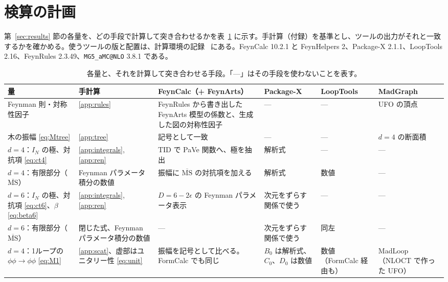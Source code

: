 \documentclass[a4paper,10pt]{ltjsarticle}
\begin{document}
\section{検算の計画}\label{sec:plan}

第~\ref{sec:results} 節の各量を、どの手段で計算して突き合わせるかを表~\ref{tab:plan} に示す。手計算（付録）を基準とし、ツールの出力がそれと一致するかを確かめる。使うツールの版と配置は、計算環境の記録~\cite{env} にある。FeynCalc 10.2.1 と FeynHelpers 2、Package-X 2.1.1、LoopTools 2.16、FeynRules 2.3.49、\texttt{MG5\_aMC@NLO} 3.8.1 である。

\begin{table}[tbp]
\centering\small
\caption{各量と、それを計算して突き合わせる手段。「—」はその手段を使わないことを表す。}
\label{tab:plan}
\begin{tabularx}{\linewidth}{>{\raggedright\arraybackslash}p{3.2cm}>{\raggedright\arraybackslash}p{2.0cm}>{\raggedright\arraybackslash}X>{\raggedright\arraybackslash}p{2.0cm}>{\raggedright\arraybackslash}p{1.7cm}>{\raggedright\arraybackslash}p{1.9cm}}
\toprule
\textbf{量} & \textbf{手計算} & \textbf{FeynCalc（+ FeynArts）} & \textbf{Package-X} & \textbf{LoopTools} & \textbf{MadGraph} \\
\midrule
Feynman 則・対称性因子 & \ref{app:rules} & FeynRules から書き出した FeynArts 模型の係数と、生成した図の対称性因子 & — & — & UFO の頂点 \\
木の振幅 \eqref{eq:Mtree} & \ref{app:tree} & 記号として一致 & — & — & $d=4$ の断面積 \\
$d=4$：$I_N$ の極、対抗項 \eqref{eq:ct4} & \ref{app:integrals}, \ref{app:ren} & TID で PaVe 関数へ、極を抽出 & 解析式 & — & — \\
$d=4$：有限部分（$\overline{\mathrm{MS}}$） & Feynman パラメータ積分の数値 & 振幅に $\overline{\mathrm{MS}}$ の対抗項を加える & 解析式 & 数値 & — \\
$d=6$：$I_N$ の極、対抗項 \eqref{eq:ct6}、$\beta$ \eqref{eq:beta6} & \ref{app:integrals}, \ref{app:ren} & $D=6-2\epsilon$ の Feynman パラメータ表示 & 次元をずらす関係で使う & — & — \\
$d=6$：有限部分（$\overline{\mathrm{MS}}$） & 閉じた式、Feynman パラメータ積分の数値 & — & 次元をずらす関係で使う & 同左 & — \\
$d=4$：1ループの $\phi\phi\to\phi\phi$ \eqref{eq:M1} & \ref{app:scat}、虚部はユニタリー性 \eqref{eq:unit} & 振幅を記号として比べる。FormCalc でも同じ & $B_0$ は解析式、$C_0$、$D_0$ は数値 & 数値（FormCalc 経由も） & MadLoop（NLOCT で作った UFO） \\

\end{tabularx}
\end{table}
\end{document}
